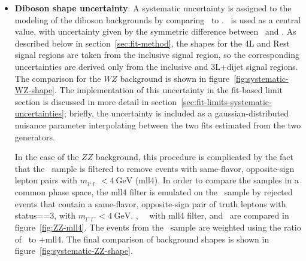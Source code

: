 \begin{itemize}
	\item \textbf{Diboson shape uncertainty}: A systematic uncertainty is assigned to the modeling of the diboson backgrounds by comparing \sherpa~to \powheg. \sherpa~is used as a central value, with uncertainty given by the symmetric difference between \sherpa~and \powheg. As described below in section~\ref{sec:fit-method}, the shapes for the 4L and Rest signal regions are taken from the inclusive signal region, so the corresponding uncertainties are derived only from the inclusive and 3L+dijet signal regions. The comparison for the $WZ$ background is shown in figure~\ref{fig:systematic-WZ-shape}. The implementation of this uncertainty in the fit-based limit section is discussed in more detail in section~\ref{sec:fit-limits-systematic-uncertainties}; briefly, the uncertainty is included as a gaussian-distributed nuisance parameter interpolating between the two fits estimated from the two generators.

	In the case of the $ZZ$ background, this procedure is complicated by the fact that the \powheg~sample is filtered to remove events with same-flavor, opposite-sign lepton pairs with $m_{l^+l^-}<4~\mbox{GeV}$ (mll4). In order to compare the samples in a common phase space, the mll4 filter is emulated on the \sherpa~sample by rejected events that contain a same-flavor, opposite-sign pair of truth leptons with status==3, with $m_{l^+l^-}<4~\mbox{GeV}$. \sherpa, ~\sherpa~with mll4 filter, and \powheg~are compared in figure~\ref{fig:ZZ-mll4}. The events from the \powheg~sample are weighted using the ratio of \sherpa~to \sherpa+mll4. The final comparison of background shapes is shown in figure~\ref{fig:systematic-ZZ-shape}.


\end{itemize}

